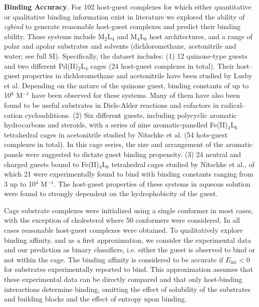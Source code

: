 \documentclass[../../main.tex]{subfiles}
\newcommand{\cgbind}{\emph{cgbind }}
\newcommand{\MLf}{M$_2$L$_4$ }
\newcommand{\MLs}{M$_4$L$_6$ }
\begin{document}
{\bfseries{Binding Accuracy}}. For 102 host-guest complexes for which either quantitative or qualitative binding information exist in literature we explored the ability of \cgbind to generate reasonable host-guest complexes and predict their binding ability. Those systems include \MLf and \MLs host architectures, and a range of polar and apolar substrates and solvents (dichloromethane, acetonitrile and water; see full SI). Specifically, the dataset includes: (1) 12 quinone‐type guests and two different Pd(II)$_2$L$_4$ cages (24 host-guest complexes in total). Their host–guest properties in dichloromethane and acetonitrile have been studied by Lusby et al.\cite{August2016} Depending on the nature of the quinone guest, binding constants of up to 10$^8$ M${}^{-1}$ have been observed for these systems. Many of them have also been found to be useful substrates in Diels-Alder reactions and cofactors in radical-cation cycloadditions.\cite{MartCentelles2018, Spicer2020} (2)	Six different guests, including polycyclic aromatic hydrocarbons and steroids, with a series of nine aromatic-panelled Fe(II)$_4$L$_6$ tetrahedral cages in acetonitrile studied by Nitschke et al. (54 hots-guest complexes in total).\cite{Ronson2017} In this cage series, the size and arrangement of the aromatic panels were suggested to dictate guest binding propensity. 
(3)	24 neutral and charged guests bound to Fe(II)$_4$L$_6$  tetrahedral cages studied by Nitschke et al.,\cite{Smulders2013} of which 21 were experimentally found to bind with binding constants ranging from 3 up to 10$^4$ M$^{-1}$. The host-guest properties of these systems in aqueous solution were found to strongly dependent on the hydrophobicity of the guest.

Cage substrate complexes were initialized using a single conformer in most cases, with the exception of cholesterol where 50 conformers were considered. In all cases reasonable host-guest complexes were obtained. To qualitatively explore binding affinity, and as a first approximation, we consider the experimental data and our prediction as binary classifiers, i.e. either the guest is observed to bind or not within the cage. The binding affinity is considered to be accurate if $E_\text{int} < 0$ for substrates experimentally reported to bind. This approximation assumes that these experimental data can be directly compared and that only host-binding interactions determine binding, omitting the effect of solubility of the substrates and building blocks and the effect of entropy upon binding. 
\end{document}
